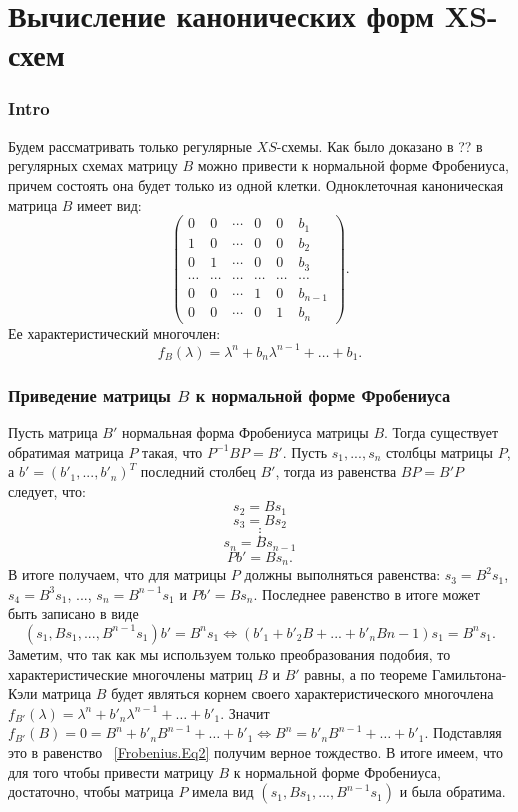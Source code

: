 \chapter{Вычисление канонических форм XS-схем}\label{Protsec}

\subsection{Intro}

Будем рассматривать только регулярные $XS$-схемы. Как было доказано в ?? в регулярных схемах матрицу $B$ можно привести к нормальной форме Фробениуса, причем состоять она будет только из одной клетки. Одноклеточная каноническая матрица $B$ имеет вид:      \[\left(\begin{array}{cccccc} {0} & {0} & {\cdots } & {0} & {0} & {b_{1} } \\ {1} & {0} & {\cdots } & {0} & {0} & {b_{2} } \\ {0} & {1} & {\cdots } & {0} & {0} & {b_{3} } \\ {\cdots } & {\cdots } & {\cdots } & {\cdots } & {\cdots } & {\cdots } \\ {0} & {0} & {\cdots } & {1} & {0} & {b_{n-1} } \\ {0} & {0} & {\cdots } & {0} & {1} & {b_{n} } \end{array}\right).\]
Ее характеристический многочлен:
\begin{equation}\label{Frobenius.CharPoly}
f_B\left({\lambda }\right)={\lambda }^n+b_n{\lambda }^{n-1}+\dots +b_1.
\end{equation}

\subsection{Приведение матрицы $B$ к нормальной форме Фробениуса}

Пусть матрица $B'$ нормальная форма Фробениуса матрицы $B$. Тогда существует обратимая матрица $P$ такая, что $P^{-1}BP=B'$. Пусть $s_1, ... , s_n$ столбцы матрицы $P$, а $b'=(b'_{1}, ... , b'_{n})^{T}$ последний столбец $B'$, тогда из равенства $BP=B'P$ следует, что:
\[s_2 = Bs_1\]
\[s_3 = Bs_2\]
$$\vdots $$
\[s_n = Bs_{n-1}\]
\[Pb' = Bs_n.\]
В итоге получаем, что для матрицы $P$ должны выполняться равенства: $s_3=B^2s_1$, $s_4=B^3s_1$, ..., $s_n=B^{n-1}s_1$ и $Pb' = Bs_n$. Последнее равенство в итоге может быть записано в виде
\begin{equation}\label{Frobenius.Eq2}
(s_1,Bs_1,...,B^{n-1}s_1)b'=B^ns_1 \Leftrightarrow (b'_1+b'_2B+ ... +b'_nB{n-1})s_1=B^ns_1.
\end{equation}
Заметим, что так как мы используем только преобразования подобия, то характеристические многочлены матриц $B$ и $B'$ равны, а по теореме Гамильтона-Кэли матрица $B$ будет являться корнем своего характеристического многочлена $f_{B'}\left({\lambda }\right)={\lambda }^n+b'_n{\lambda }^{n-1}+\dots +b'_1$. Значит $f_{B'}\left({B}\right)=0={B}^n+b'_n{B }^{n-1}+\dots +b'_1 \Leftrightarrow B^n=b'_n{B }^{n-1}+\dots +b'_1$. Подставляя это в равенство 
~\ref{Frobenius.Eq2} получим верное тождество. В итоге имеем, что для того чтобы привести матрицу $B$ к нормальной форме Фробениуса, достаточно, чтобы матрица $P$ имела вид $(s_1,Bs_1,...,B^{n-1}s_1)$ и была обратима.

